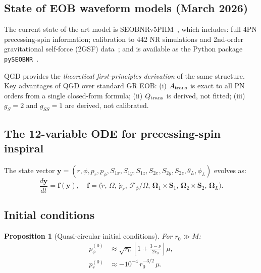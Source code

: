 \documentclass[11pt,a4paper]{article}
\theoremstyle{plain}
\newtheorem{proposition}[theorem]{Proposition}
\theoremstyle{definition}
\theoremstyle{remark}
\begin{document}
\subsection{State of EOB waveform models (March 2026)}

The current state-of-the-art model is SEOBNRv5PHM~\cite{SEOBNRv5,Khalil2023},
which includes:
full 4PN precessing-spin information; calibration to 442 NR simulations and
2nd-order gravitational self-force (2GSF) data~\cite{vanDeMetnt2023};
and is available as the Python package \texttt{pySEOBNR}~\cite{pySEOBNR}.

QGD provides the \emph{theoretical first-principles derivation} of the same
structure.  Key advantages of QGD over standard GR EOB: (i) $A_{\rm trans}$ is
exact to all PN orders from a single closed-form formula; (ii) $Q_{\rm trans}$
is derived, not fitted; (iii) $g_S=2$ and $g_{SS}=1$ are derived, not
calibrated.

\subsection{The 12-variable ODE for precessing-spin inspiral}

The state vector $\mathbf{y}=(r,\phi,p_r,p_\phi,S_{1x},S_{1y},S_{1z},S_{2x},S_{2y},S_{2z},\theta_L,\phi_L)$ evolves as:
\begin{equation}
  \frac{d\mathbf{y}}{dt} = \mathbf{f}(\mathbf{y}),
  \quad
  \mathbf{f} = \bigl(\dot{r},\,\Omega,\,\dot{p}_r,\,\mathcal{F}_\phi/\Omega,\,
    \boldsymbol{\Omega}_1\times\mathbf{S}_1,\,
    \boldsymbol{\Omega}_2\times\mathbf{S}_2,\,
    \boldsymbol{\Omega}_L\bigr).
  \label{eq:ODE12}
\end{equation}

\subsection{Initial conditions}

\begin{proposition}[Quasi-circular initial conditions]\label{prop:IC}
For $r_0\gg M$:
\begin{align}
  p_\phi^{(0)} &\approx \sqrt{r_0}\!\left[1+\frac{3-\nu}{2r_0}\right]\mu,
  \label{eq:IC_pphi}\\
  p_r^{(0)} &\approx -10^{-4}\,r_0^{-3/2}\,\mu.
  \label{eq:IC_pr}
\end{align}
\end{proposition}
\end{document}
